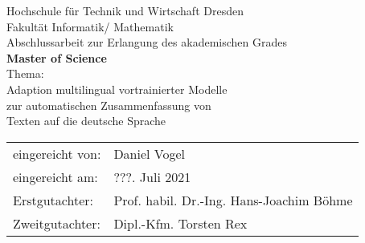 \begin{titlepage}

\begin{center}
\large{Hochschule für Technik und Wirtschaft Dresden} \\[1ex]
\large{Fakultät Informatik/ Mathematik} \\[15ex]
\Large{Abschlussarbeit zur Erlangung des akademischen Grades} \\[3ex]
\LARGE{\textbf{Master of Science}} \\[10ex]
\Large{Thema:} \\[1ex]
\Large{Adaption multilingual vortrainierter Modelle} \\[1ex]
\Large{zur automatischen Zusammenfassung von} \\[1ex]
\Large{Texten auf die deutsche Sprache} \\[15ex]
\end{center}

\begin{flushleft}
\begin{tabular}{ll}
eingereicht von: & \quad Daniel Vogel \\[2ex]
eingereicht am: & \quad ???. Juli 2021 \\[2ex]
Erstgutachter:  & \quad Prof. habil. Dr.-Ing. Hans-Joachim Böhme \\[2ex]
Zweitgutachter: & \quad Dipl.-Kfm. Torsten Rex \\[2ex]
\end{tabular}
\end{flushleft}

\end{titlepage}
